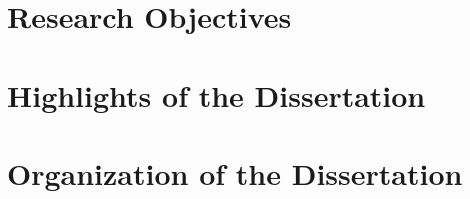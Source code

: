 \section{Research Objectives}

\section{Highlights of the Dissertation}

\section{Organization of the Dissertation}
